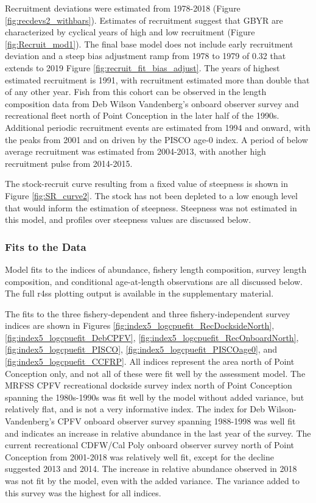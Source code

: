 \documentclass[12pt,]{article}
\begin{document}
Recruitment deviations were estimated from 1978-2018 (Figure
\ref{fig:recdevs2_withbars}). Estimates of recruitment suggest that GBYR
are characterized by cyclical years of high and low recruitment (Figure
\ref{fig:Recruit_mod1}). The final base model does not include early
recruitment deviation and a steep bias adjustment ramp from 1978 to 1979
of 0.32 that extends to 2019 Figure \ref{fig:recruit_fit_bias_adjust}.
The years of highest estimated recruitment is 1991, with recruitment
estimated more than double that of any other year. Fish from this cohort
can be observed in the length composition data from Deb Wilson
Vandenberg's onboard observer survey and recreational fleet north of
Point Conception in the later half of the 1990s. Additional periodic
recruitment events are estimated from 1994 and onward, with the peaks
from 2001 and on driven by the PISCO age-0 index. A period of below
average recruitment was estimated from 2004-2013, with another high
recruitment pulse from 2014-2015.

The stock-recruit curve resulting from a fixed value of steepness is
shown in Figure \ref{fig:SR_curve2}. The stock has not been depleted to
a low enough level that would inform the estimation of steepness.
Steepness was not estimated in this model, and profiles over steepness
values are discussed below.

\subsubsection{Fits to the Data}\label{fits-to-the-data}

Model fits to the indices of abundance, fishery length composition,
survey length composition, and conditional age-at-length observations
are all discussed below. The full r4ss plotting output is available in
the supplementary material.

The fits to the three fishery-dependent and three fishery-independent
survey indices are shown in Figures
\ref{fig:index5_logcpuefit_RecDocksideNorth},
\ref{fig:index5_logcpuefit_DebCPFV},
\ref{fig:index5_logcpuefit_RecOnboardNorth},
\ref{fig:index5_logcpuefit_PISCO},
\ref{fig:index5_logcpuefit_PISCOage0}, and
\ref{fig:index5_logcpuefit_CCFRP}. All indices represent the area north
of Point Conception only, and not all of these were fit well by the
assessment model. The MRFSS CPFV recreational dockside survey index
north of Point Conception spanning the 1980s-1990s was fit well by the
model without added variance, but relatively flat, and is not a very
informative index. The index for Deb Wilson-Vandenberg's CPFV onboard
observer survey spanning 1988-1998 was well fit and indicates an
increase in relative abundance in the last year of the survey. The
current recreational CDFW/Cal Poly onboard observer survey north of
Point Conception from 2001-2018 was relatively well fit, except for the
decline suggested 2013 and 2014. The increase in relative abundance
observed in 2018 was not fit by the model, even with the added variance.
The variance added to this survey was the highest for all indices.
\end{document}
